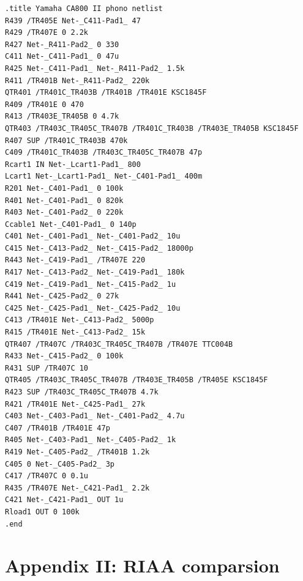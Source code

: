 \documentclass[]{article}
\begin{document}
\begin{verbatim}
.title Yamaha CA800 II phono netlist
R439 /TR405E Net-_C411-Pad1_ 47
R429 /TR407E 0 2.2k
R427 Net-_R411-Pad2_ 0 330
C411 Net-_C411-Pad1_ 0 47u
R425 Net-_C411-Pad1_ Net-_R411-Pad2_ 1.5k
R411 /TR401B Net-_R411-Pad2_ 220k
QTR401 /TR401C_TR403B /TR401B /TR401E KSC1845F
R409 /TR401E 0 470
R413 /TR403E_TR405B 0 4.7k
QTR403 /TR403C_TR405C_TR407B /TR401C_TR403B /TR403E_TR405B KSC1845F
R407 SUP /TR401C_TR403B 470k
C409 /TR401C_TR403B /TR403C_TR405C_TR407B 47p
Rcart1 IN Net-_Lcart1-Pad1_ 800
Lcart1 Net-_Lcart1-Pad1_ Net-_C401-Pad1_ 400m
R201 Net-_C401-Pad1_ 0 100k
R401 Net-_C401-Pad1_ 0 820k
R403 Net-_C401-Pad2_ 0 220k
Ccable1 Net-_C401-Pad1_ 0 140p
C401 Net-_C401-Pad1_ Net-_C401-Pad2_ 10u
C415 Net-_C413-Pad2_ Net-_C415-Pad2_ 18000p
R443 Net-_C419-Pad1_ /TR407E 220
R417 Net-_C413-Pad2_ Net-_C419-Pad1_ 180k
C419 Net-_C419-Pad1_ Net-_C415-Pad2_ 1u
R441 Net-_C425-Pad2_ 0 27k
C425 Net-_C425-Pad1_ Net-_C425-Pad2_ 10u
C413 /TR401E Net-_C413-Pad2_ 5000p
R415 /TR401E Net-_C413-Pad2_ 15k
QTR407 /TR407C /TR403C_TR405C_TR407B /TR407E TTC004B
R433 Net-_C415-Pad2_ 0 100k
R431 SUP /TR407C 10
QTR405 /TR403C_TR405C_TR407B /TR403E_TR405B /TR405E KSC1845F
R423 SUP /TR403C_TR405C_TR407B 4.7k
R421 /TR401E Net-_C425-Pad1_ 27k
C403 Net-_C403-Pad1_ Net-_C401-Pad2_ 4.7u
C407 /TR401B /TR401E 47p
R405 Net-_C403-Pad1_ Net-_C405-Pad2_ 1k
R419 Net-_C405-Pad2_ /TR401B 1.2k
C405 0 Net-_C405-Pad2_ 3p
C417 /TR407C 0 0.1u
R435 /TR407E Net-_C421-Pad1_ 2.2k
C421 Net-_C421-Pad1_ OUT 1u
Rload1 OUT 0 100k
.end
\end{verbatim}

\section{Appendix II: RIAA comparsion}
\end{document}
